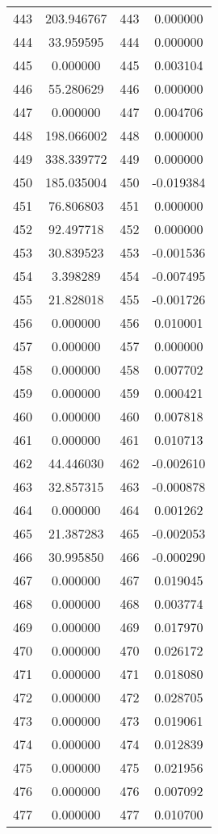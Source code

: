 \documentclass[12pt]{article}
\begin{document}
\begin{longtable}{@{}cccc@{}}
443 & 203.946767 & 443 & 0.000000 \\
444 & 33.959595 & 444 & 0.000000 \\
445 & 0.000000 & 445 & 0.003104 \\
446 & 55.280629 & 446 & 0.000000 \\
447 & 0.000000 & 447 & 0.004706 \\
448 & 198.066002 & 448 & 0.000000 \\
449 & 338.339772 & 449 & 0.000000 \\
450 & 185.035004 & 450 & -0.019384 \\
451 & 76.806803 & 451 & 0.000000 \\
452 & 92.497718 & 452 & 0.000000 \\
453 & 30.839523 & 453 & -0.001536 \\
454 & 3.398289 & 454 & -0.007495 \\
455 & 21.828018 & 455 & -0.001726 \\
456 & 0.000000 & 456 & 0.010001 \\
457 & 0.000000 & 457 & 0.000000 \\
458 & 0.000000 & 458 & 0.007702 \\
459 & 0.000000 & 459 & 0.000421 \\
460 & 0.000000 & 460 & 0.007818 \\
461 & 0.000000 & 461 & 0.010713 \\
462 & 44.446030 & 462 & -0.002610 \\
463 & 32.857315 & 463 & -0.000878 \\
464 & 0.000000 & 464 & 0.001262 \\
465 & 21.387283 & 465 & -0.002053 \\
466 & 30.995850 & 466 & -0.000290 \\
467 & 0.000000 & 467 & 0.019045 \\
468 & 0.000000 & 468 & 0.003774 \\
469 & 0.000000 & 469 & 0.017970 \\
470 & 0.000000 & 470 & 0.026172 \\
471 & 0.000000 & 471 & 0.018080 \\
472 & 0.000000 & 472 & 0.028705 \\
473 & 0.000000 & 473 & 0.019061 \\
474 & 0.000000 & 474 & 0.012839 \\
475 & 0.000000 & 475 & 0.021956 \\
476 & 0.000000 & 476 & 0.007092 \\
477 & 0.000000 & 477 & 0.010700 \\

\end{longtable}
\end{document}
